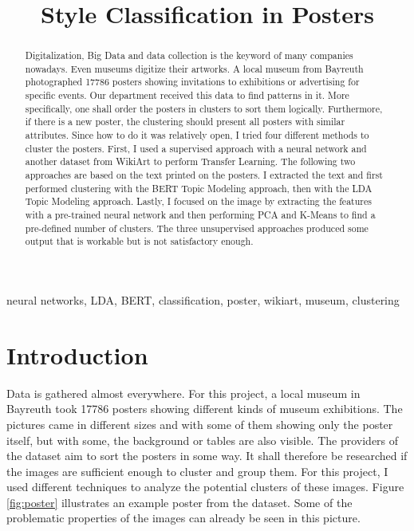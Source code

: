 \documentclass[conference]{IEEEtran}
\begin{document}
\title{Style Classification in Posters\\
}

\author{
}

\maketitle

\begin{abstract}

Digitalization, Big Data and data collection is the keyword of many companies nowadays. Even museums digitize their artworks. A local museum from Bayreuth photographed 17786 posters showing invitations to exhibitions or advertising for specific events. Our department received this data to find patterns in it. More specifically, one shall order the posters in clusters to sort them logically.
Furthermore, if there is a new poster, the clustering should present all posters with similar attributes. Since how to do it was relatively open, I tried four different methods to cluster the posters. First, I used a supervised approach with a neural network and another dataset from WikiArt to perform Transfer Learning. The following two approaches are based on the text printed on the posters. I extracted the text and first performed clustering with the BERT Topic Modeling approach, then with the LDA Topic Modeling approach. Lastly, I focused on the image by extracting the features with a pre-trained neural network and then performing PCA and K-Means to find a pre-defined number of clusters. The three unsupervised approaches produced some output that is workable but is not satisfactory enough.

\end{abstract}
\begin{IEEEkeywords}
neural networks, LDA, BERT, classification, poster, wikiart, museum, clustering
\end{IEEEkeywords}

\section{Introduction}
Data is gathered almost everywhere. For this project, a local museum in Bayreuth took 17786 posters showing different kinds of museum exhibitions. The pictures came in different sizes and with some of them showing only the poster itself, but with some, the background or tables are also visible. The providers of the dataset aim to sort the posters in some way. It shall therefore be researched if the images are sufficient enough to cluster and group them. For this project, I used different techniques to analyze the potential clusters of these images. Figure \ref{fig:poster} illustrates an example poster from the dataset. Some of the problematic properties of the images can already be seen in this picture.
\end{document}
